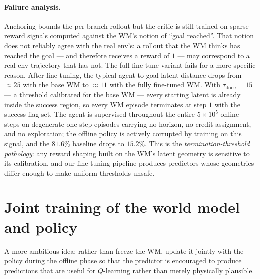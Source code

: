 \paragraph{Failure analysis.}
Anchoring bounds the per-branch rollout but the critic is still trained
on sparse-reward signals computed against the WM's notion of ``goal
reached''. That notion does not reliably agree with the real env's: a
rollout that the WM thinks has reached the goal --- and therefore
receives a reward of $1$ --- may correspond to a real-env trajectory
that has not. The full-fine-tune variant fails for a more specific
reason. After fine-tuning, the typical agent-to-goal latent distance
drops from $\approx 25$ with the base WM to $\approx 11$ with the
fully fine-tuned WM. With $\tau_{\text{done}}=15$ --- a threshold
calibrated for the base WM --- every starting latent is already inside
the success region, so every WM episode terminates at step $1$ with the
success flag set. The agent is supervised throughout the entire
$5\!\times\!10^5$ online steps on degenerate one-step episodes carrying
no horizon, no credit assignment, and no exploration; the offline
policy is actively corrupted by training on this signal, and the
$81.6\%$ baseline drops to $15.2\%$. This is the
\emph{termination-threshold pathology}: any reward shaping built on the
WM's latent geometry is sensitive to its calibration, and our
fine-tuning pipeline produces predictors whose geometries differ
enough to make uniform thresholds unsafe.

\section{Joint training of the world model and policy}
\label{sec:owm-exp3}

A more ambitious idea: rather than freeze the WM, update it jointly
with the policy during the offline phase so that the predictor is
encouraged to produce predictions that are useful for $Q$-learning
rather than merely physically plausible.

